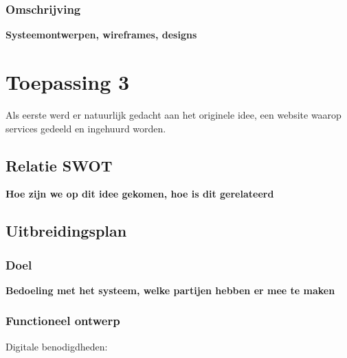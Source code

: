 \subsubsection{Omschrijving}
{\bf Systeemontwerpen, wireframes, designs}


\section{Toepassing 3}

Als eerste werd er natuurlijk gedacht aan het originele idee,
een website waarop services gedeeld en ingehuurd worden.

\subsection{Relatie SWOT}
{\bf Hoe zijn we op dit idee gekomen, hoe is dit gerelateerd}

\subsection{Uitbreidingsplan}

\subsubsection{Doel}
{\bf Bedoeling met het systeem,
  welke partijen hebben er mee te maken}





\subsubsection{Functioneel ontwerp}

Digitale benodigdheden:

